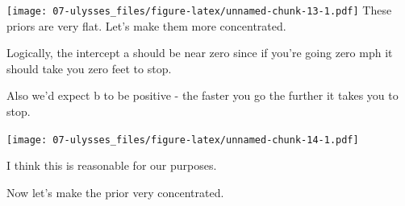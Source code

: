 \documentclass[
]{book}
\newenvironment{Shaded}{\begin{snugshade}}{\end{snugshade}}
\newcommand{\AttributeTok}[1]{\textcolor[rgb]{0.77,0.63,0.00}{#1}}
\newcommand{\DecValTok}[1]{\textcolor[rgb]{0.00,0.00,0.81}{#1}}
\newcommand{\FloatTok}[1]{\textcolor[rgb]{0.00,0.00,0.81}{#1}}
\newcommand{\FunctionTok}[1]{\textcolor[rgb]{0.00,0.00,0.00}{#1}}
\newcommand{\NormalTok}[1]{#1}
\newcommand{\OtherTok}[1]{\textcolor[rgb]{0.56,0.35,0.01}{#1}}
\newcommand{\SpecialCharTok}[1]{\textcolor[rgb]{0.00,0.00,0.00}{#1}}
\newcommand{\StringTok}[1]{\textcolor[rgb]{0.31,0.60,0.02}{#1}}
\begin{document}
\texttt{[image: 07-ulysses\_files/figure-latex/unnamed-chunk-13-1.pdf]}
These priors are very flat. Let's make them more concentrated.

Logically, the intercept a should be near zero since if you're going zero mph it should take you zero feet to stop.

Also we'd expect b to be positive - the faster you go the further it takes you to stop.

\begin{Shaded}
\end{Shaded}

\texttt{[image: 07-ulysses\_files/figure-latex/unnamed-chunk-14-1.pdf]}

I think this is reasonable for our purposes.

Now let's make the prior very concentrated.
\end{document}
